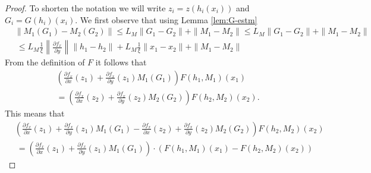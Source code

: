 \documentclass[11pt, leqno]{amsart}
\theoremstyle{definition}
\begin{document}
\begin{proof}
To shorten the notation we will write $z_i = z(h_i(x_i))$ and $G_i=G(h_i)(x_i)$. 
We first observe that using Lemma \ref{lem:G-estm}  
\begin{align}\label{eq:Mdiff}
	& \|M_1(G_1)-M_2(G_2)\|\leq L_M\|G_1-G_2\| + \|M_1-M_2\| \leq L_M\|G_1-G_2\| + \|M_1-M_2\| \nonumber \\
	& \ \leq L_M\frac{1}{\xi}\left\|\frac{\partial f_x}{\partial y}\right\|\|h_1-h_2\| + L_M \frac{1}{\xi}\|x_1-x_2\|+ \|M_1-M_2\|
\end{align}
From  the definition of $F$ it follows that 
\begin{align*}
&\left(\frac{\partial f_x}{\partial x}(z_1) + \frac{\partial f_x}{\partial y}(z_1)M_1(G_1) \right) F(h_1,M_1)(x_1)\\
& =
 \left(\frac{\partial f_x}{\partial x}(z_2) + \frac{\partial f_x}{\partial y}(z_2)M_2(G_2) \right)F(h_2,M_2)(x_2).
 \end{align*}
This means that
\begin{align*}
& \left(\frac{\partial f_x}{\partial x}(z_1) + \frac{\partial f_x}{\partial y}(z_1)M_1(G_1)   -\frac{\partial f_x}{\partial x}(z_2) + \frac{\partial f_x}{\partial y}(z_2)M_2(G_2) \right) F(h_2,M_2)(x_2)\\
& \ = \left(\frac{\partial f_x}{\partial x}(z_1) + \frac{\partial f_x}{\partial y}(z_1)M_1(G_1) \right)  \cdot \left( F(h_1,M_1)(x_1)- F(h_2,M_2)(x_2)\right)
\end{align*}


\end{proof}
\end{document}
